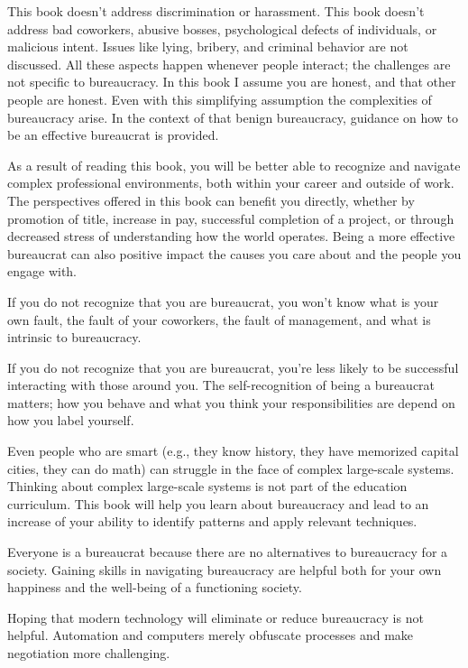 This book doesn't address discrimination or harassment. This book doesn't address bad coworkers, abusive bosses, psychological defects of individuals, or malicious intent. Issues like lying, bribery, and criminal behavior are not discussed. All these aspects happen whenever people interact; the challenges are not specific to bureaucracy. In this book I assume you are honest, and that other people are honest. Even with this simplifying assumption the complexities of bureaucracy arise. In the context of that benign bureaucracy, guidance on how to be an effective bureaucrat is provided.


As a result of reading this book, you will be better able to recognize and navigate complex professional environments, both within your career and outside of work. The perspectives offered in this book can benefit you directly, whether by promotion of title, increase in pay, successful completion of a project, or through decreased stress of understanding how the world operates. Being a more effective bureaucrat can also positive impact the causes you care about and the people you engage with.

If you do not recognize that you are bureaucrat, you won't know what is your own fault, the fault of your coworkers, the fault of management, and what is intrinsic to bureaucracy. 

If you do not recognize that you are bureaucrat, you're less likely to be successful interacting with those around you. The self-recognition of being a bureaucrat matters; how you behave and what you think your responsibilities are depend on how you label yourself.

Even people who are smart (e.g., they know history, they have memorized capital cities, they can do math) can struggle in the face of complex large-scale systems. Thinking about complex large-scale systems is not part of the education curriculum. This book will help you learn about bureaucracy and lead to an increase of your ability to identify patterns and apply relevant techniques.

Everyone is a bureaucrat because there are no alternatives to bureaucracy for a society. Gaining skills in navigating bureaucracy are helpful both for your own happiness and the well-being of a functioning society. 

Hoping that modern technology will eliminate or reduce bureaucracy is not helpful. Automation and computers merely obfuscate processes and make negotiation more challenging. 

